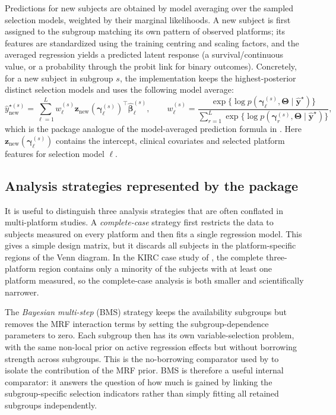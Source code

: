 \documentclass[article]{jss}
\begin{document}
Predictions for new subjects are obtained by  model
averaging over the sampled selection models, weighted by their marginal
likelihoods. A new subject is first assigned to the subgroup matching its own
pattern of observed platforms; its features are standardized using the training
centring and scaling factors, and the averaged regression yields a predicted
latent response (a survival/continuous value, or a probability through the
probit link for binary outcomes).
Concretely, for a new subject in subgroup $s$, the implementation keeps the
highest-posterior distinct selection models and uses the following
model average:
\[
  \widehat{y}^{\star(s)}_{\mathrm{new}}
  =
  \sum_{\ell=1}^{L}
  w_{\ell}^{(s)}
  \bm{z}_{\mathrm{new}}\!\left(\bm{\gamma}_{\ell}^{(s)}\right)^{\top}
  \widehat{\bm{\beta}}_{\ell}^{(s)}, \qquad
  w_{\ell}^{(s)}
  =
  \frac{\exp\{\log p(\bm{\gamma}_{\ell}^{(s)},\bm{\Theta}\mid
  \widehat{\bm{y}}^{\star})\}}
  {\sum_{r=1}^{L}\exp\{\log p(\bm{\gamma}_{r}^{(s)},\bm{\Theta}\mid
  \widehat{\bm{y}}^{\star})\}},
\]
which is the package analogue of the model-averaged prediction formula in
\citet{chekouo2017}.  Here $\bm{z}_{\mathrm{new}}(\bm{\gamma}_{\ell}^{(s)})$
contains the intercept, clinical covariates and selected platform features for
selection model $\ell$.

\subsection{Analysis strategies represented by the package}\label{sec:strategies}

It is useful to distinguish three analysis strategies that are often conflated
in multi-platform studies.  A \emph{complete-case} strategy first restricts the
data to subjects measured on every platform and then fits a single regression
model.  This gives a simple design matrix, but it discards all subjects in the
platform-specific regions of the Venn diagram.  In the KIRC case study of
\citet{chekouo2017}, the complete three-platform region contains only a
minority of the subjects with at least one platform measured, so the
complete-case analysis is both smaller and scientifically narrower.

The \emph{Bayesian multi-step} (BMS) strategy keeps the availability subgroups
but removes the MRF interaction terms by setting the subgroup-dependence
parameters to zero.  Each subgroup then has its own variable-selection problem,
with the same non-local prior on active regression effects but without borrowing
strength across subgroups.  This is the no-borrowing comparator used by
\citet{chekouo2017} to isolate the contribution of the MRF prior.  BMS is
therefore a useful internal comparator: it answers the question of how much is
gained by linking the subgroup-specific selection indicators rather than simply
fitting all retained subgroups independently.
\end{document}
